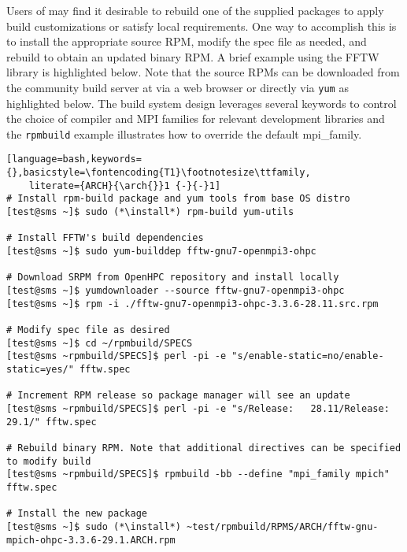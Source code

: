 Users of \OHPC{} may find it desirable to rebuild one of the supplied packages
to apply build customizations or satisfy local requirements. One way to
accomplish this is to install the appropriate source RPM, modify the spec file
as needed, and rebuild to obtain an updated binary RPM. A brief example using
the FFTW library is highlighted below.  Note that the source RPMs can be downloaded from the
community build server at \href{https://build.openhpc.community}
{\color{blue}{https://build.openhpc.community}} via a web browser or directly
via \texttt{yum} as highlighted below. The \OHPC{} build system design
leverages several keywords to control the choice of compiler and MPI families
for relevant development libraries and the \texttt{rpmbuild} example
illustrates how to override the default mpi\_family.

\begin{lstlisting}[language=bash,keywords={},basicstyle=\fontencoding{T1}\footnotesize\ttfamily,
    literate={ARCH}{\arch{}}1 {-}{-}1]
# Install rpm-build package and yum tools from base OS distro
[test@sms ~]$ sudo (*\install*) rpm-build yum-utils

# Install FFTW's build dependencies
[test@sms ~]$ sudo yum-builddep fftw-gnu7-openmpi3-ohpc

# Download SRPM from OpenHPC repository and install locally
[test@sms ~]$ yumdownloader --source fftw-gnu7-openmpi3-ohpc
[test@sms ~]$ rpm -i ./fftw-gnu7-openmpi3-ohpc-3.3.6-28.11.src.rpm

# Modify spec file as desired
[test@sms ~]$ cd ~/rpmbuild/SPECS
[test@sms ~rpmbuild/SPECS]$ perl -pi -e "s/enable-static=no/enable-static=yes/" fftw.spec

# Increment RPM release so package manager will see an update
[test@sms ~rpmbuild/SPECS]$ perl -pi -e "s/Release:   28.11/Release:   29.1/" fftw.spec

# Rebuild binary RPM. Note that additional directives can be specified to modify build
[test@sms ~rpmbuild/SPECS]$ rpmbuild -bb --define "mpi_family mpich" fftw.spec

# Install the new package
[test@sms ~]$ sudo (*\install*) ~test/rpmbuild/RPMS/ARCH/fftw-gnu-mpich-ohpc-3.3.6-29.1.ARCH.rpm
\end{lstlisting}
